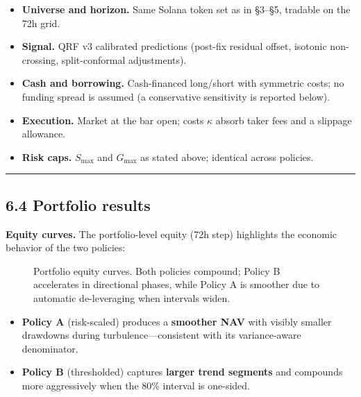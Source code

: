 \documentclass[
  a4paper,
  DIV=11,
  numbers=noendperiod]{scrreprt}
\providecommand{\tightlist}{%
  \setlength{\itemsep}{0pt}\setlength{\parskip}{0pt}}
\begin{document}
\begin{itemize}
\tightlist
\item
  \textbf{Universe and horizon.} Same Solana token set as in §3--§5,
  tradable on the 72h grid.
\item
  \textbf{Signal.} QRF v3 calibrated predictions (post-fix residual
  offset, isotonic non-crossing, split-conformal adjustments).
\item
  \textbf{Cash and borrowing.} Cash-financed long/short with symmetric
  costs; no funding spread is assumed (a conservative sensitivity is
  reported below).
\item
  \textbf{Execution.} Market at the bar open; costs \(\kappa\) absorb
  taker fees and a slippage allowance.
\item
  \textbf{Risk caps.} \(S_{\max}\) and \(G_{\max}\) as stated above;
  identical across policies.
\end{itemize}

\begin{center}\rule{0.5\linewidth}{0.5pt}\end{center}

\subsection{6.4 Portfolio results}\label{portfolio-results}

\textbf{Equity curves.} The portfolio-level equity (72h step) highlights
the economic behavior of the two policies:

\begin{figure}


\caption{\label{fig-equity-portfolio}Portfolio equity curves. Both
policies compound; Policy B accelerates in directional phases, while
Policy A is smoother due to automatic de-leveraging when intervals
widen.}

\end{figure}%

\begin{itemize}
\tightlist
\item
  \textbf{Policy A} (risk-scaled) produces a \textbf{smoother NAV} with
  visibly smaller drawdowns during turbulence---consistent with its
  variance-aware denominator.
\item
  \textbf{Policy B} (thresholded) captures \textbf{larger trend
  segments} and compounds more aggressively when the 80\% interval is
  one-sided.
\end{itemize}
\end{document}
